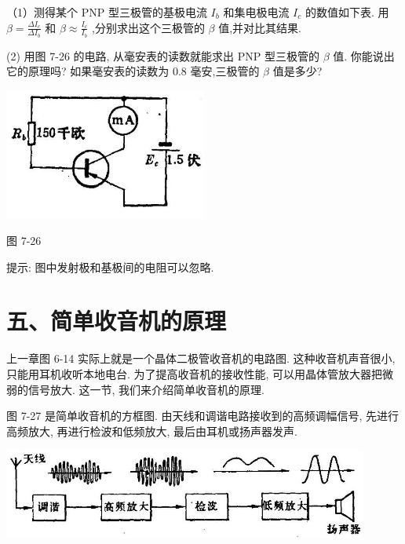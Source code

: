 \documentclass[10pt]{article}
\begin{document}
（1）测得某个 PNP 型三极管的基极电流 \({I}_{b}\) 和集电极电流 \({I}_{c}\) 的数值如下表. 用 \(\beta = \frac{\Delta {I}_{c}}{\Delta {I}_{b}}\) 和 \(\beta \approx \frac{{I}_{c}}{{I}_{b}}\) ,分别求出这个三极管的 \(\beta\) 值,并对比其结果.

\begin{center}
\end{center}

(2) 用图 7-26 的电路, 从毫安表的读数就能求出 PNP 型三极管的 \(\beta\) 值. 你能说出它的原理吗? 如果毫安表的读数为 0.8 毫安,三极管的 \(\beta\) 值是多少?

\begin{center}
\includegraphics[max width=0.5\textwidth]{images/01913056-1f15-74d8-9184-9aab52c9d66b_236_736025.jpg}
\end{center}

图 7-26

提示: 图中发射极和基极间的电阻可以忽略.

\section*{五、简单收音机的原理}

上一章图 6-14 实际上就是一个晶体二极管收音机的电路图. 这种收音机声音很小, 只能用耳机收听本地电台. 为了提高收音机的接收性能, 可以用晶体管放大器把微弱的信号放大. 这一节, 我们来介绍简单收音机的原理.

图 7-27 是简单收音机的方框图. 由天线和调谐电路接收到的高频调幅信号, 先进行高频放大, 再进行检波和低频放大, 最后由耳机或扬声器发声.

\begin{center}
\includegraphics[max width=0.9\textwidth]{images/01913056-1f15-74d8-9184-9aab52c9d66b_237_975328.jpg}
\end{center}
\end{document}
